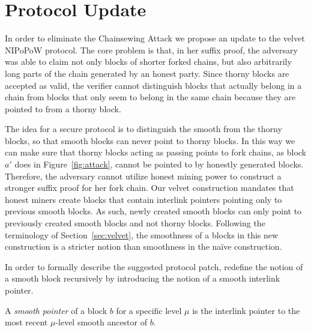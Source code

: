 \section{Protocol Update}
In order to eliminate the Chainsewing Attack we propose an update to the velvet NIPoPoW protocol. The core problem is that, in her suffix proof, the adversary was able to claim not only blocks of shorter forked chains, but also arbitrarily long parts of the chain generated by an honest party. Since thorny blocks are accepted as valid, the verifier cannot distinguish blocks that actually belong in a chain from blocks that only seem to belong in the same chain because they are pointed to from a thorny block.

The idea for a secure protocol is to distinguish the smooth from the thorny blocks, so that smooth blocks can never point to thorny blocks. In this way we can make sure that thorny blocks acting as passing points to fork chains, as block $a'$ does in Figure~\ref{fig:attack}, cannot be pointed to by honestly generated blocks. Therefore, the adversary cannot utilize honest mining power to construct a stronger suffix proof for her fork chain. Our velvet construction mandates that honest miners create blocks that contain interlink pointers pointing only to previous smooth blocks. As such, newly created smooth blocks can only point to previously created smooth blocks and not thorny blocks. Following the terminology of Section~\ref{sec:velvet}, the smoothness of a blocks in this new construction is a stricter notion than smoothness in the na\"ive construction.

In order to formally describe the suggested protocol patch, redefine the notion of a smooth block recursively by introducing the notion of a smooth interlink pointer.

\begin{definition}
  A \emph{smooth pointer} of a block $b$ for a specific level $\mu$ is the interlink pointer to the most recent $\mu$-level smooth ancestor of $b$.
	\label{defn:smooth_pointer}
\end{definition}

